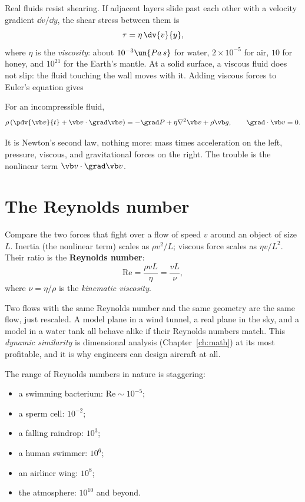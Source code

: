 Real fluids resist shearing. If adjacent layers slide past each other with a velocity gradient $\dd v/\dd y$, the shear stress between them is
\[
  \tau = \eta\,\dv{v}{y},
\]
where $\eta$ is the \emph{viscosity}: about $10^{-3}\un{Pa\,s}$ for water, $2\times10^{-5}$ for air, $10$ for honey, and $10^{21}$ for the Earth's mantle. At a solid surface, a viscous fluid does not slip: the fluid touching the wall moves with it. Adding viscous forces to Euler's equation gives

\begin{law}
For an incompressible fluid,
\[
  \rho\left(\pdv{\vb v}{t} + \vb v\cdot\grad\vb v\right) = -\grad P + \eta\nabla^2\vb v + \rho\vb g,
  \qquad \grad\cdot\vb v = 0 .
\]
\end{law}

It is Newton's second law, nothing more: mass times acceleration on the left, pressure, viscous, and gravitational forces on the right. The trouble is the nonlinear term $\vb v\cdot\grad\vb v$.

\section{The Reynolds number}

Compare the two forces that fight over a flow of speed $v$ around an object of size $L$. Inertia (the nonlinear term) scales as $\rho v^2/L$; viscous force scales as $\eta v/L^2$. Their ratio is the \textbf{Reynolds number}:
\[
  \mathrm{Re} = \frac{\rho vL}{\eta} = \frac{vL}{\nu},
\]
where $\nu = \eta/\rho$ is the \emph{kinematic viscosity}.

\begin{keyidea}
Two flows with the same Reynolds number and the same geometry are the same flow, just rescaled. A model plane in a wind tunnel, a real plane in the sky, and a model in a water tank all behave alike if their Reynolds numbers match. This \emph{dynamic similarity} is dimensional analysis (Chapter~\ref{ch:math}) at its most profitable, and it is why engineers can design aircraft at all.
\end{keyidea}

The range of Reynolds numbers in nature is staggering:
\begin{itemize}[itemsep=2pt]
  \item a swimming bacterium: $\mathrm{Re}\sim10^{-5}$;
  \item a sperm cell: $10^{-2}$;
  \item a falling raindrop: $10^{3}$;
  \item a human swimmer: $10^{6}$;
  \item an airliner wing: $10^{8}$;
  \item the atmosphere: $10^{10}$ and beyond.
\end{itemize}

